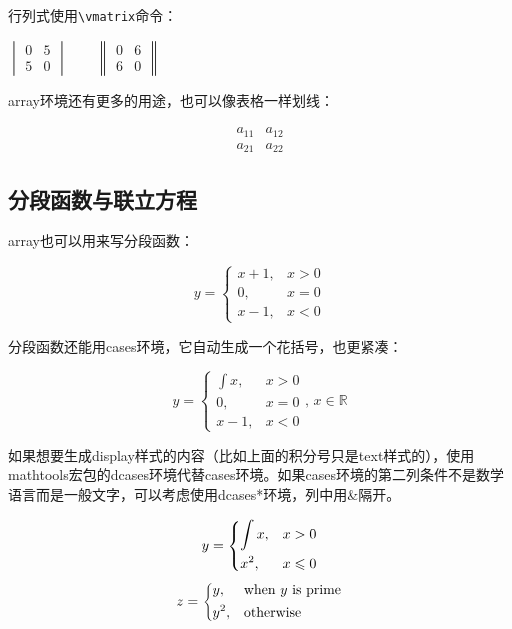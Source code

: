 {行列式使用\verb|\vmatrix|命令：

\begin{codeshow}
\centering $\begin{vmatrix}
0 & 5 \\ 5 & 0 \end{vmatrix}\qquad
\begin{Vmatrix} 0 & 6 \\
6 & 0 \end{Vmatrix}$
\end{codeshow}

array环境还有更多的用途，也可以像表格一样划线：

\begin{codeshow}
\[\begin{array}{c|c}
  a_{11} & a_{12} \\
  \hline
  a_{21} & a_{22}
  \end{array}\]
\end{codeshow}

\subsection{分段函数与联立方程}
array也可以用来写分段函数：

\begin{codeshow}
\[y=\left\{\begin{array}{ll}
x+1, & x>0 \\
0,   & x=0 \\
x-1, & x<0
\end{array}\right.\]
\end{codeshow}

分段函数还能用cases环境，它自动生成一个花括号，也更紧凑：

\begin{codeshow}
\[y=\begin{cases}
\int x, & x>0 \\
0,   & x=0 \\
x-1, & x<0
\end{cases},\,
x\in\mathbb{R}\]
\end{codeshow}

如果想要生成display样式的内容（比如上面的积分号只是text样式的），使用mathtools宏包的dcases环境代替cases环境。如果cases环境的第二列条件不是数学语言而是一般文字，可以考虑使用dcases*环境，列中用\&{}隔开。

\begin{codeshow}
\[y=\begin{dcases}
  \int x, & x>0 \\
  x^2, & x\leqslant 0
  \end{dcases}\]
\[z=\begin{dcases*}
  y, & when $y$ is prime\\
  y^2, & otherwise
  \end{dcases*}\]
\end{codeshow}

}
